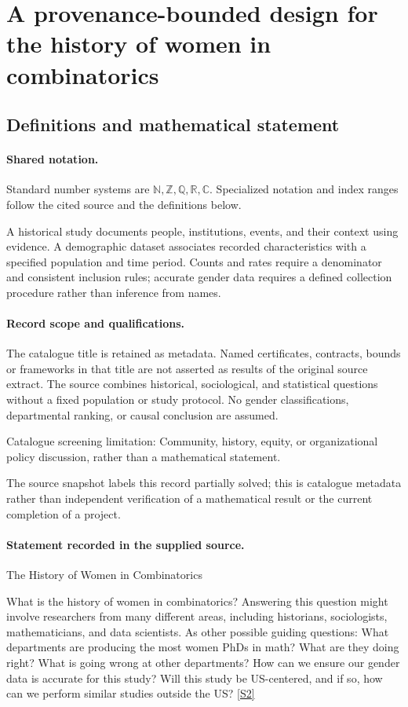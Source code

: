 \documentclass[11pt]{article}
\newcommand{\sref}[2]{\hyperlink{source:#1:#2}{[S#2]}}
\begin{document}
\section{A provenance-bounded design for the history of women in combinatorics}\label{statement}

\subsection{Definitions and mathematical statement}

\paragraph{Shared notation.}Standard number systems are $\mathbb N,\mathbb Z,\mathbb Q,\mathbb R,\mathbb C$. Specialized notation and index ranges follow the cited source and the definitions below.


A historical study documents people, institutions, events, and their context using evidence. A demographic dataset associates recorded characteristics with a specified population and time period. Counts and rates require a denominator and consistent inclusion rules; accurate gender data requires a defined collection procedure rather than inference from names.
\paragraph{Record scope and qualifications.}
The catalogue title is retained as metadata. Named certificates, contracts, bounds or frameworks in that title are not asserted as results of the original source extract.
The source combines historical, sociological, and statistical questions without a fixed population or study protocol. No gender classifications, departmental ranking, or causal conclusion are assumed.

Catalogue screening limitation: Community, history, equity, or organizational policy discussion, rather than a mathematical statement.

The source snapshot labels this record partially solved; this is catalogue metadata rather than independent verification of a mathematical result or the current completion of a project.
\paragraph{Statement recorded in the supplied source.}
The History of Women in Combinatorics

What is the history of women in combinatorics? Answering this question might involve researchers from many different areas, including historians, sociologists, mathematicians, and data scientists. As other possible guiding questions: What departments are producing the most women PhDs in math? What are they doing right? What is going wrong at other departments? How can we ensure our gender data is accurate for this study? Will this study be US-centered, and if so, how can we perform similar studies outside the US? \sref{statement}{2}
\end{document}
